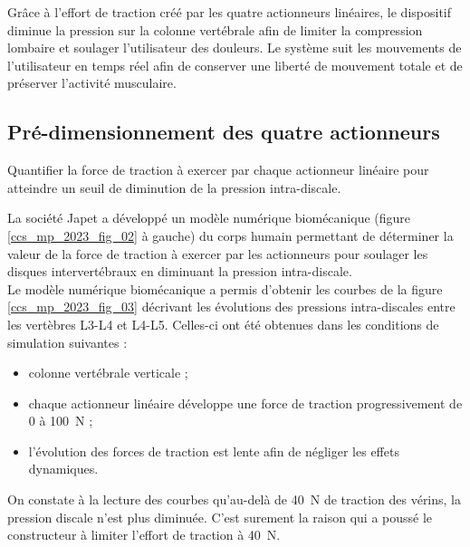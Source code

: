 Grâce à l'effort de traction créé par les quatre actionneurs linéaires, le dispositif diminue la pression sur la colonne vertébrale afin de limiter la compression lombaire et soulager l'utilisateur des douleurs. Le système suit les mouvements de l'utilisateur en temps réel afin de conserver une liberté de mouvement totale et de préserver l'activité musculaire.
\fi
\subsection{Pré-dimensionnement des quatre actionneurs} %
\begin{obj}
Quantifier la force de traction à exercer par chaque actionneur linéaire pour atteindre un seuil de diminution de la pression intra-discale.
\end{obj}
\ifprof
\else

La société Japet a développé un modèle numérique biomécanique (figure \ref{ccs_mp_2023_fig_02} à gauche) du corps humain permettant de déterminer la valeur de la force de traction à exercer par les actionneurs pour soulager les disques intervertébraux en diminuant la pression intra-discale.\\
Le modèle numérique biomécanique a permis d'obtenir les courbes de la figure \ref{ccs_mp_2023_fig_03} décrivant les évolutions des pressions intra-discales entre les vertèbres L3-L4 et L4-L5. Celles-ci ont été obtenues dans les conditions de simulation suivantes :

\begin{itemize}
  \item colonne vertébrale verticale ;
  \item chaque actionneur linéaire développe une force de traction progressivement de 0 à \SI{100}{N} ;
  \item l'évolution des forces de traction est lente afin de négliger les effets dynamiques.
\end{itemize}
\fi

\ifprof
\begin{corrige}
On constate à la lecture des courbes qu'au-delà de \SI{40}{N} de traction des vérins, la pression discale n'est plus diminuée. C'est surement la raison qui a poussé le constructeur à limiter l'effort de traction à \SI{40}{N}.
\end{corrige}
\else
\fi

